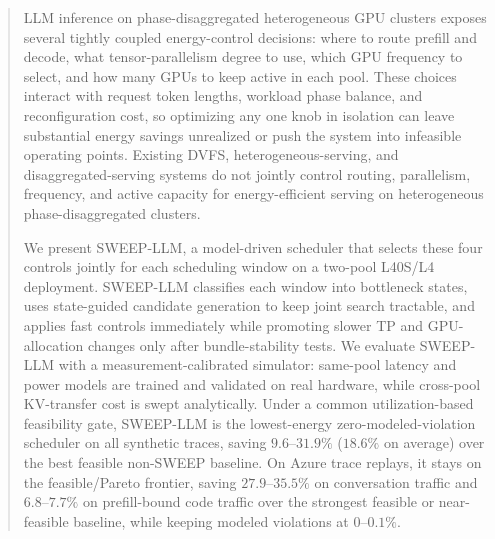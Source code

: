 \begin{abstract}
LLM inference on phase-disaggregated heterogeneous GPU clusters exposes several tightly coupled energy-control decisions: where to route prefill and decode, what tensor-parallelism degree to use, which GPU frequency to select, and how many GPUs to keep active in each pool. These choices interact with request token lengths, workload phase balance, and reconfiguration cost, so optimizing any one knob in isolation can leave substantial energy savings unrealized or push the system into infeasible operating points. Existing DVFS, heterogeneous-serving, and disaggregated-serving systems do not jointly control routing, parallelism, frequency, and active capacity for energy-efficient serving on heterogeneous phase-disaggregated clusters.

We present SWEEP-LLM, a model-driven scheduler that selects these four controls jointly for each scheduling window on a two-pool L40S/L4 deployment. SWEEP-LLM classifies each window into bottleneck states, uses state-guided candidate generation to keep joint search tractable, and applies fast controls immediately while promoting slower TP and GPU-allocation changes only after bundle-stability tests. We evaluate SWEEP-LLM with a measurement-calibrated simulator: same-pool latency and power models are trained and validated on real hardware, while cross-pool KV-transfer cost is swept analytically. Under a common utilization-based feasibility gate, SWEEP-LLM is the lowest-energy zero-modeled-violation scheduler on all synthetic traces, saving $9.6$–$31.9\%$ ($18.6\%$ on average) over the best feasible non-SWEEP baseline. On Azure trace replays, it stays on the feasible/Pareto frontier, saving $27.9$–$35.5\%$ on conversation traffic and $6.8$–$7.7\%$ on prefill-bound code traffic over the strongest feasible or near-feasible baseline, while keeping modeled violations at $0$–$0.1\%$.
\end{abstract}

